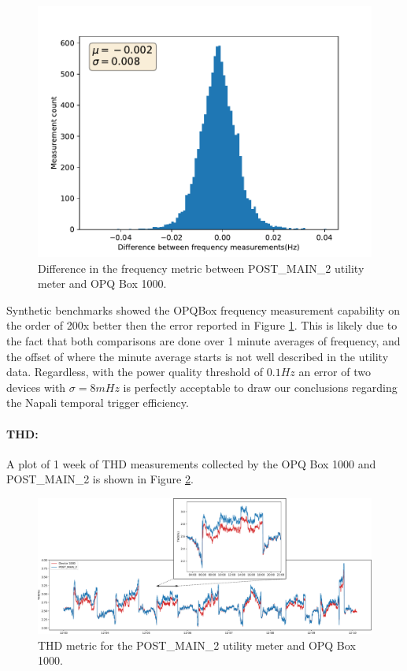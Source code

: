 \begin{figure}[ht!]
    \centering
    \includegraphics[width=0.6\linewidth]{img/napali_eval/gt/gt_f_diff.pdf}
    \caption{Difference in the frequency metric between POST\_MAIN\_2 utility meter and OPQ Box 1000.}
    \label{expdes:fig:postmain2:freq_diff}
\end{figure}

Synthetic benchmarks showed the OPQBox frequency measurement capability on the order of 200x better then the error reported in Figure \ref{expdes:fig:postmain2:freq_diff}.
This is likely due to the fact that both comparisons are done over 1 minute averages of frequency, and the offset of where the minute average starts is not well described in the utility data.
Regardless, with the power quality threshold of $0.1Hz$ an error of two devices with $\sigma=8mHz$ is perfectly acceptable to draw our conclusions regarding the Napali temporal trigger efficiency.

\paragraph{THD:}
A plot of 1 week of THD measurements collected by the OPQ Box 1000 and POST\_MAIN\_2 is shown in Figure \ref{expdes:fig:postmain2:thd}.

\begin{figure}[ht!]
    \centering
    \includegraphics[width=1\linewidth]{img/napali_eval/gt/gt_thd.pdf}
    \caption{THD metric for the POST\_MAIN\_2 utility meter and OPQ Box 1000.}
    \label{expdes:fig:postmain2:thd}
\end{figure}

